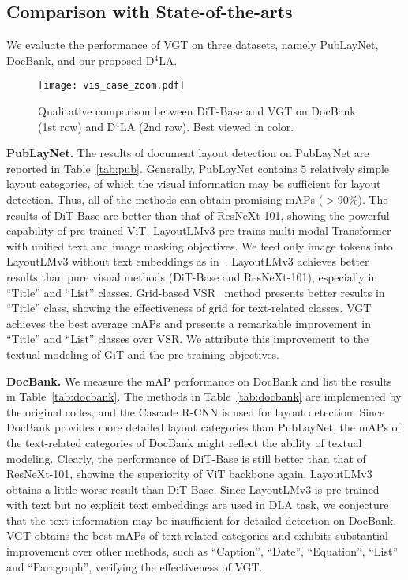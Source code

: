 \documentclass[10pt,twocolumn,letterpaper]{article}
\begin{document}
\subsection{Comparison with State-of-the-arts}
We evaluate the performance of VGT on three datasets, namely PubLayNet, DocBank, and our proposed D$^4$LA.

\begin{figure*}[!htp]\centering
\texttt{[image: vis\_case\_zoom.pdf]}
\caption{Qualitative comparison between DiT-Base and VGT on DocBank (1st row)  and D$^4$LA (2nd row). Best viewed in color.}
 \label{fig:vis_list}
\end{figure*}

\noindent
\textbf{PubLayNet.}  The results of document layout detection on PubLayNet are reported in Table~\ref{tab:pub}.
Generally, PubLayNet contains $5$ relatively simple layout categories,
of which the visual information may be sufficient for layout detection.
Thus, all of the methods can obtain promising mAPs ($>90\%$).
The results of DiT-Base are better than that of ResNeXt-101, 
showing the powerful capability of pre-trained ViT.
LayoutLMv3 pre-trains multi-modal Transformer with unified text and image masking objectives.
We feed only image tokens into LayoutLMv3 without text embeddings as in~\cite{huang2022layoutlmv3}.
LayoutLMv3 achieves better results than pure visual methods (DiT-Base and ResNeXt-101), especially in ``Title'' and ``List'' classes.
Grid-based VSR~\cite{zhang2021vsr} method presents better results in ``Title'' class,
showing the effectiveness of grid for text-related classes.
VGT achieves the best average mAPs and presents a remarkable improvement in ``Title'' and ``List'' classes over VSR.
We attribute this improvement to the textual modeling of GiT and the pre-training objectives.

\noindent
\textbf{DocBank.} 
We measure the mAP performance on DocBank and list the results in Table~\ref{tab:docbank}.
The methods in Table~\ref{tab:docbank} are implemented by the original codes, and the Cascade R-CNN is used for layout detection.
Since DocBank provides more detailed layout categories than PubLayNet,
the mAPs of the text-related categories of DocBank might reflect the ability of textual modeling.
Clearly, the performance of DiT-Base is still better than that of ResNeXt-101, 
showing the superiority of ViT backbone again.
LayoutLMv3 obtains a little worse result than DiT-Base.
Since LayoutLMv3 is pre-trained with text but no explicit text embeddings are used in DLA task,
we conjecture that the text information may be insufficient for detailed detection on DocBank.
VGT obtains the best mAPs of text-related categories and exhibits substantial improvement over other methods, such as ``Caption'', ``Date'', ``Equation'', ``List'' and ``Paragraph'', verifying the effectiveness of VGT.
\end{document}
